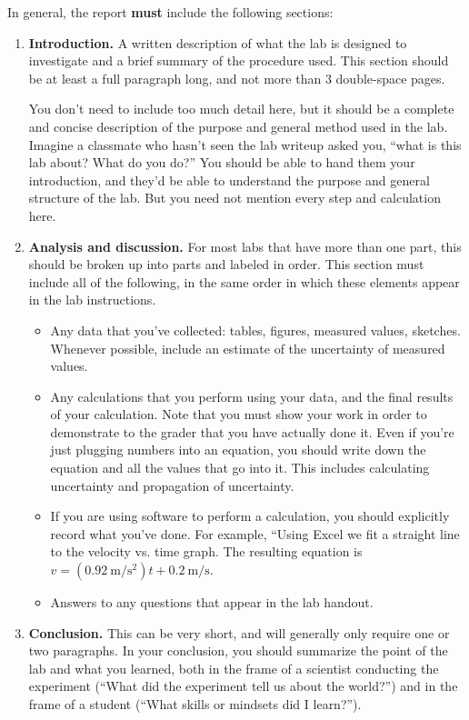 In general, the report \textbf{must} include the following sections:
\begin{enumerate}
	\item \textbf{Introduction.} A written description of what the lab is designed to investigate and a brief summary of the procedure used. This section should be at least a full paragraph long, and not more than 3 double-space pages.
	
	You don't need to include too much detail here, but it should be a complete and concise description of the purpose and general method used in the lab. Imagine a classmate who hasn't seen the lab writeup asked you, ``what is this lab about? What do you do?'' You should be able to hand them your introduction, and they'd be able to understand the purpose and general structure of the lab. But you need not mention every step and calculation here.
	
	\item \textbf{Analysis and discussion.} For most labs that have more than one part, this should be broken up into parts and labeled in order. This section must include all of the following, in the same order in which these elements appear in the lab instructions.
	\begin{itemize}
		\item Any data that you've collected: tables, figures, measured values, sketches. Whenever possible, include an estimate of the uncertainty of measured values.
		
		\item Any calculations that you perform using your data, and the final results of your calculation. Note that you must show your work in order to demonstrate to the grader that you have actually done it. Even if you're just plugging numbers into an equation, you should write down the equation and all the values that go into it. This includes calculating uncertainty and propagation of uncertainty.
		
		\item If you are using software to perform a calculation, you should explicitly record what you've done. For example, ``Using Excel we fit a straight line to the velocity vs. time graph. The resulting equation is $v = (0.92\:\mathrm{m/s^2}) t + 0.2\:\mathrm{m/s}$.
		
		\item Answers to any questions that appear in the lab handout.
	\end{itemize}

	\item \textbf{Conclusion.} This can be very short, and will generally only require one or two paragraphs. In your conclusion, you should summarize the point of the lab and what you learned, both in the frame of a scientist conducting the experiment (``What did the experiment tell us about the world?'') and in the frame of a student (``What skills or mindsets did I learn?'').
\end{enumerate}

